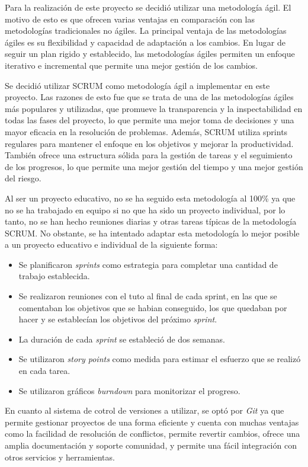 Para la realización de este proyecto se decidió utilizar una metodología ágil. El motivo de esto es que ofrecen varias ventajas en comparación con las metodologías tradicionales no ágiles. La principal ventaja de las metodologías ágiles es su flexibilidad y capacidad de adaptación a los cambios. En lugar de seguir un plan rigido y establecido, las metodologías ágiles permiten un enfoque iterativo e incremental que permite una mejor gestión de los cambios.

Se decidió utilizar SCRUM como metodología ágil a implementar en este proyecto. Las razones de esto fue que se trata de una de las metodologías ágiles más populares y utilizadas, que promueve la transparencia y la inspectabilidad en todas las fases del proyecto, lo que permite una mejor toma de decisiones y una mayor eficacia en la resolución de problemas. Además, SCRUM utiliza sprints regulares para mantener el enfoque en los objetivos y mejorar la productividad. También ofrece una estructura sólida para la gestión de tareas y el seguimiento de los progresos, lo que permite una mejor gestión del tiempo y una mejor gestión del riesgo.

Al ser un proyecto educativo, no se ha seguido esta metodología al 100\% ya que no se ha trabajado en equipo si no que ha sido un proyecto individual, por lo tanto, no se han hecho reuniones diarias y otras tareas típicas de la metodología SCRUM. No obstante, se ha intentado adaptar esta metodología lo mejor posible a un proyecto educativo e individual de la siguiente forma:
\begin{itemize}
    \item Se planificaron \textit{sprints} como estrategia para completar una cantidad de trabajo establecida.
    \item Se realizaron reuniones con el tuto al final de cada sprint, en las que se comentaban los objetivos que se habian conseguido, los que quedaban por hacer y se establecían los objetivos del próximo \textit{sprint}.
    \item La duración de cada \textit{sprint} se estableció de dos semanas.
    \item Se utilizaron \textit{story points} como medida para estimar el esfuerzo que se realizó en cada tarea.
    \item Se utilizaron gráficos \textit{burndown} para monitorizar el progreso. 
\end{itemize}

En cuanto al sistema de cotrol de versiones a utilizar, se optó por \textit{Git} ya que permite gestionar proyectos de una forma eficiente y cuenta con muchas ventajas como la facilidad de resolución de conflictos, permite revertir cambios, ofrece una amplia documentación y soporte comunidad, y permite una fácil integración con otros servicios y herramientas.


